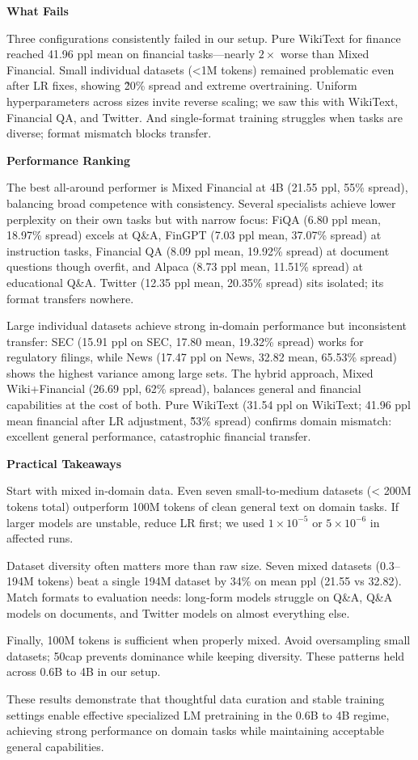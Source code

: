 \textbf{What Fails}

Three configurations consistently failed in our setup. Pure WikiText for finance reached 41.96 ppl mean on financial tasks—nearly $2\times$ worse than Mixed Financial. Small individual datasets (<1M tokens) remained problematic even after LR fixes, showing \~20\% spread and extreme overtraining. Uniform hyperparameters across sizes invite reverse scaling; we saw this with WikiText, Financial QA, and Twitter. And single‑format training struggles when tasks are diverse; format mismatch blocks transfer.

\textbf{Performance Ranking}

The best all‑around performer is Mixed Financial at 4B (21.55 ppl, 55\% spread), balancing broad competence with consistency. Several specialists achieve lower perplexity on their own tasks but with narrow focus: FiQA (6.80 ppl mean, 18.97\% spread) excels at Q\&A, FinGPT (7.03 ppl mean, 37.07\% spread) at instruction tasks, Financial QA (8.09 ppl mean, 19.92\% spread) at document questions though overfit, and Alpaca (8.73 ppl mean, 11.51\% spread) at educational Q\&A. Twitter (12.35 ppl mean, 20.35\% spread) sits isolated; its format transfers nowhere.

Large individual datasets achieve strong in‑domain performance but inconsistent transfer: SEC (15.91 ppl on SEC, 17.80 mean, 19.32\% spread) works for regulatory filings, while News (17.47 ppl on News, 32.82 mean, 65.53\% spread) shows the highest variance among large sets. The hybrid approach, Mixed Wiki+Financial (26.69 ppl, 62\% spread), balances general and financial capabilities at the cost of both. Pure WikiText (31.54 ppl on WikiText; 41.96 ppl mean financial after LR adjustment, \~53\% spread) confirms domain mismatch: excellent general performance, catastrophic financial transfer.

\textbf{Practical Takeaways}

Start with mixed in‑domain data. Even seven small‑to‑medium datasets (< 200M tokens total) outperform 100M tokens of clean general text on domain tasks. If larger models are unstable, reduce LR first; we used $1\times10^{-5}$ or $5\times10^{-6}$ in affected runs.

Dataset diversity often matters more than raw size. Seven mixed datasets (0.3–194M tokens) beat a single 194M dataset by 34\% on mean ppl (21.55 vs 32.82). Match formats to evaluation needs: long‑form models struggle on Q\&A, Q\&A models on documents, and Twitter models on almost everything else.

Finally, 100M tokens is sufficient when properly mixed. Avoid oversampling small datasets; 50cap prevents dominance while keeping diversity. These patterns held across 0.6B to 4B in our setup.

These results demonstrate that thoughtful data curation and stable training settings enable effective specialized LM pretraining in the 0.6B to 4B regime, achieving strong performance on domain tasks while maintaining acceptable general capabilities.
